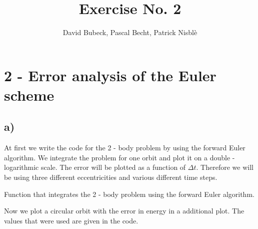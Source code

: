 \documentclass[11pt, a4paper, reqno]{scrartcl}
\begin{document}
    \title{Exercise No. 2}
    \author{David Bubeck, Pascal Becht, Patrick Nisbl\`e}
    \maketitle
    

    \newpage
    \section*{2 - Error analysis of the Euler scheme}

    	\subsection*{a)}
			At first we write the code for the 2 - body problem by using the 
			forward Euler algorithm. We integrate the problem for one orbit and 
			plot it on a double - logarithmic scale. The error will be plotted 
			as a function of $\Delta t$. Therefore we will be using three 
			different eccentricities and various different time steps.
			\newline
			
			Function that integrates the 2 - body problem using the forward 
			Euler algorithm.
			
    		\begin{figure}[H]
        		        
    		\end{figure}
    		
    		
    		Now we plot a circular orbit with the error in energy in a 
    		additional plot. The values that were used are given in the code.
    		
    		\begin{figure}[H]
        		   
    		\end{figure}
    		
\end{document}
